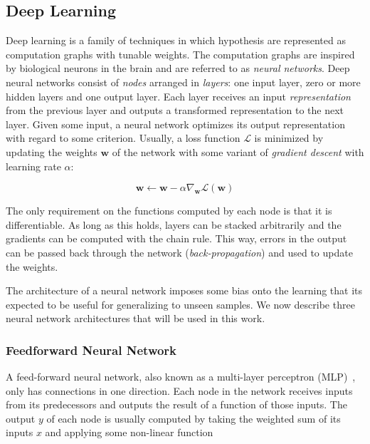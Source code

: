 \subsection{Deep Learning}
\label{sec:deeplearning}

Deep learning is a family of techniques in which hypothesis are represented as computation graphs with tunable weights.
The computation graphs are inspired by biological neurons in the brain and are referred to as \textit{neural networks}.
Deep neural networks consist of \textit{nodes} arranged in \textit{layers}: one input layer, zero or more hidden layers and one output layer.
Each layer receives an input \textit{representation}~\cite{bengio_representation_2014} from the previous layer and outputs a transformed representation to the next layer.
Given some input, a neural network optimizes its output representation with regard to some criterion.
Usually, a loss function \(\mathcal{L}\) is minimized by updating the weights \(\mathbf{w}\) of the network with some variant of \textit{gradient descent} with learning rate \(\alpha\):

\begin{equation}
    \mathbf{w} \leftarrow \mathbf{w} - \alpha \nabla_\mathbf{w} \mathcal{L}(\mathbf{w}) 
\end{equation}

The only requirement on the functions computed by each node is that it is differentiable.
As long as this holds, layers can be stacked arbitrarily and the gradients can be computed with the chain rule.
This way, errors in the output can be passed back through the network (\textit{back-propagation}) and used to update the weights.~\cite{russell_artificial_2021,goodfellow_deep_2016}

The architecture of a neural network imposes some bias onto the learning that its expected to be useful for generalizing to unseen samples.
We now describe three neural network architectures that will be used in this work.

\subsubsection{Feedforward Neural Network}

A feed-forward neural network, also known as a multi-layer perceptron (MLP)~\cite{goodfellow_deep_2016}, only has connections in one direction.
Each node in the network receives inputs from its predecessors and outputs the result of a function of those inputs.
The output \(y\) of each node is usually computed by taking the weighted sum of its inputs \(x\) and applying some non-linear function

